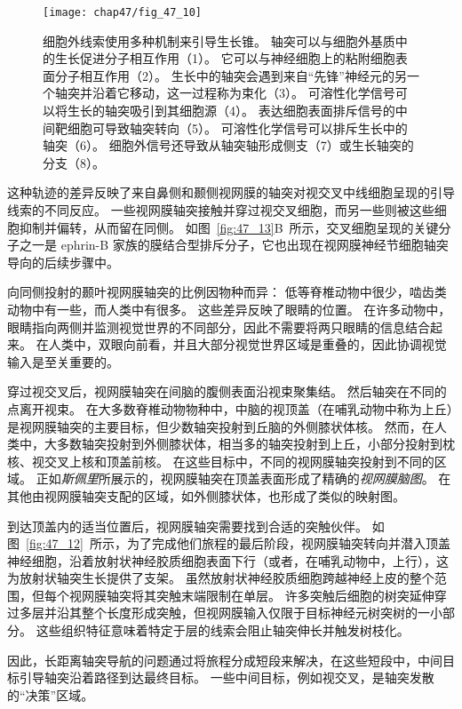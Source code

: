 \begin{figure}[htbp]
	\centering
	\texttt{[image: chap47/fig\_47\_10]}
	\caption{细胞外线索使用多种机制来引导生长锥。
		轴突可以与细胞外基质中的生长促进分子相互作用（1）。
		它可以与神经细胞上的粘附细胞表面分子相互作用（2）。
		生长中的轴突会遇到来自“先锋”神经元的另一个轴突并沿着它移动，这一过程称为束化（3）。
		可溶性化学信号可以将生长的轴突吸引到其细胞源（4）。
		表达细胞表面排斥信号的中间靶细胞可导致轴突转向（5）。
		可溶性化学信号可以排斥生长中的轴突（6）。
		细胞外信号还导致从轴突轴形成侧支（7）或生长轴突的分支（8）。}
	\label{fig:47_10}
\end{figure}


这种轨迹的差异反映了来自鼻侧和颞侧视网膜的轴突对视交叉中线细胞呈现的引导线索的不同反应。
一些视网膜轴突接触并穿过视交叉细胞，而另一些则被这些细胞抑制并偏转，从而留在同侧。
如图~\ref{fig:47_13}B~所示，交叉细胞呈现的关键分子之一是 ephrin-B 家族的膜结合型排斥分子，它也出现在视网膜神经节细胞轴突导向的后续步骤中。


向同侧投射的颞叶视网膜轴突的比例因物种而异：
低等脊椎动物中很少，啮齿类动物中有一些，而人类中有很多。
这些差异反映了眼睛的位置。
在许多动物中，眼睛指向两侧并监测视觉世界的不同部分，因此不需要将两只眼睛的信息结合起来。
在人类中，双眼向前看，并且大部分视觉世界区域是重叠的，因此协调视觉输入是至关重要的。


穿过视交叉后，视网膜轴突在间脑的腹侧表面沿视束聚集结。
然后轴突在不同的点离开视束。
在大多数脊椎动物物种中，中脑的视顶盖（在哺乳动物中称为上丘）是视网膜轴突的主要目标，但少数轴突投射到丘脑的外侧膝状体核。
然而，在人类中，大多数轴突投射到外侧膝状体，相当多的轴突投射到上丘，小部分投射到枕核、视交叉上核和顶盖前核。
在这些目标中，不同的视网膜轴突投射到不同的区域。
正如\textit{斯佩里}所展示的，视网膜轴突在顶盖表面形成了精确的\textit{视网膜脑图}。
在其他由视网膜轴突支配的区域，如外侧膝状体，也形成了类似的映射图。


到达顶盖内的适当位置后，视网膜轴突需要找到合适的突触伙伴。
如图~\ref{fig:47_12}~所示，为了完成他们旅程的最后阶段，视网膜轴突转向并潜入顶盖神经细胞，沿着放射状神经胶质细胞表面下行（或者，在哺乳动物中，上行），这为放射状轴突生长提供了支架。
虽然放射状神经胶质细胞跨越神经上皮的整个范围，但每个视网膜轴突将其突触末端限制在单层。
许多突触后细胞的树突延伸穿过多层并沿其整个长度形成突触，但视网膜输入仅限于目标神经元树突树的一小部分。
这些组织特征意味着特定于层的线索会阻止轴突伸长并触发树枝化。


因此，长距离轴突导航的问题通过将旅程分成短段来解决，在这些短段中，中间目标引导轴突沿着路径到达最终目标。
一些中间目标，例如视交叉，是轴突发散的“决策”区域。


